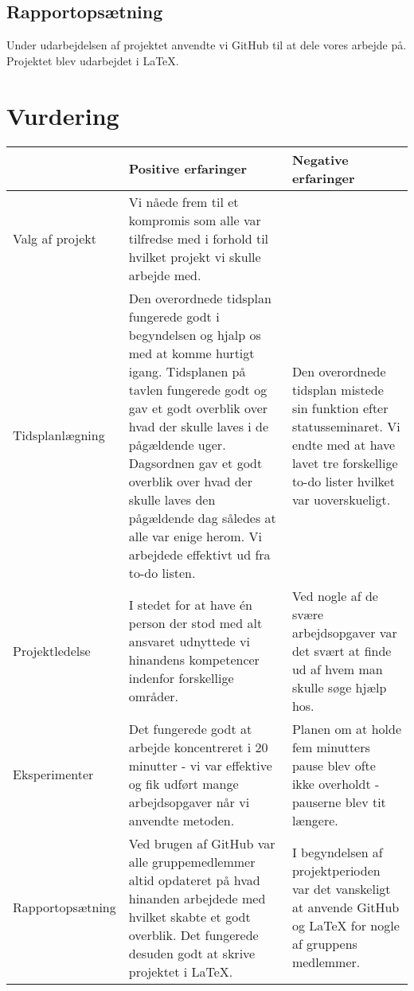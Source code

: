 \subsection{Rapportopsætning}
Under udarbejdelsen af projektet anvendte vi GitHub til at dele vores arbejde på. Projektet blev udarbejdet i LaTeX. 

\section{Vurdering}



\begin{table}[h]
	\begin{tabular}{|l|p{5cm}|p{5cm}|}
		\hline
		&\textbf{Positive erfaringer}&\textbf{Negative erfaringer}\\ \hline
		Valg af projekt  & Vi nåede frem til et kompromis som alle var tilfredse med i forhold til hvilket projekt vi skulle arbejde med. & \\ \hline  
		Tidsplanlægning  & Den overordnede tidsplan fungerede godt i begyndelsen og hjalp os med at komme hurtigt igang. Tidsplanen på tavlen fungerede godt og gav et godt overblik over hvad der skulle laves i de pågældende uger. Dagsordnen gav et godt overblik over hvad der skulle laves den pågældende dag således at alle var enige herom. Vi arbejdede effektivt ud fra to-do listen. & Den overordnede tidsplan mistede sin funktion efter statusseminaret. Vi endte med at have lavet tre forskellige to-do lister hvilket var uoverskueligt. \\ \hline
		Projektledelse   & I stedet for at have én person der stod med alt ansvaret udnyttede vi hinandens kompetencer indenfor forskellige områder. & Ved nogle af de svære arbejdsopgaver var det svært at finde ud af hvem man skulle søge hjælp hos. \\ \hline
		Eksperimenter    & Det fungerede godt at arbejde koncentreret i 20 minutter - vi var effektive og fik udført mange arbejdsopgaver når vi anvendte metoden. & Planen om at holde fem minutters pause blev ofte ikke overholdt - pauserne blev tit længere. \\ \hline
		Rapportopsætning & Ved brugen af GitHub var alle gruppemedlemmer altid opdateret på hvad hinanden arbejdede med hvilket skabte et godt overblik. Det fungerede desuden godt at skrive projektet i LaTeX. & I begyndelsen af projektperioden var det vanskeligt at anvende GitHub og LaTeX for nogle af gruppens medlemmer.\\ \hline
     
	\end{tabular}
\end{table}


